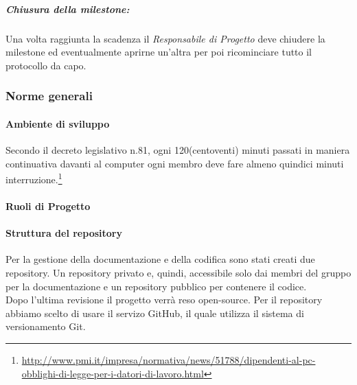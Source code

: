 		\subparagraph{Chiusura della milestone:}
		
		Una volta raggiunta la scadenza il \textit{Responsabile di Progetto} deve chiudere la \gls{milestone} ed eventualmente aprirne un'altra per poi ricominciare tutto il protocollo da capo.

\newpage
\subsubsection{Norme generali}
	\paragraph{Ambiente di sviluppo}
	Secondo il decreto legislativo n.81, ogni 120(centoventi) minuti passati in maniera continuativa davanti al computer ogni membro deve fare almeno quindici minuti interruzione.\footnote{\url{http://www.pmi.it/impresa/normativa/news/51788/dipendenti-al-pc-obblighi-di-legge-per-i-datori-di-lavoro.html}}

	\paragraph{Ruoli di Progetto}
	
	
\newpage
	\paragraph{Struttura del repository} \label{repository}
	Per la gestione della documentazione e della codifica sono stati creati due \gls{repository}. Un \gls{repository} privato e, quindi, accessibile solo dai membri del gruppo \GRUPPO per la documentazione e un \gls{repository} pubblico per contenere il codice.\\
	Dopo l'ultima revisione il progetto verrà reso open-source.
	Per il \gls{repository} abbiamo scelto di usare il servizo \gls{GitHub}, il quale utilizza il sistema di \gls{versionamento} \gls{Git}.
	

